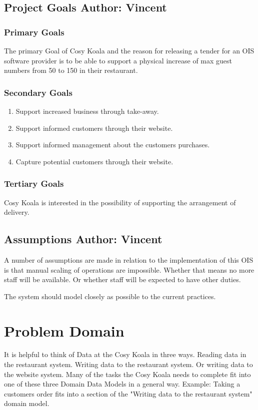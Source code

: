 \documentclass{article}
\begin{document}
\subsection{Project Goals \normalsize\textbf{Author: Vincent}}
\subsubsection{Primary Goals}
The primary Goal of Cosy Koala and the reason for releasing a tender for an OIS software provider is to be able to support a physical increase of max guest numbers from 50 to 150 in their restaurant.
\subsubsection{Secondary Goals}
\begin{enumerate}
    \item Support increased business through take-away.
    \item Support informed customers through their website.
    \item Support informed management about the customers purchases.
    \item Capture potential customers through their website.
\end{enumerate}
\subsubsection{Tertiary Goals}
Cosy Koala is interested in the possibility of supporting the arrangement of delivery.

\subsection{Assumptions \normalsize\textbf{Author: Vincent}}
A number of assumptions are made in relation to the implementation of this OIS is that manual scaling of operations are impossible. Whether that means no more staff will be available. Or whether staff will be expected to have other duties.

The system should model closely as possible to the current practices.


\clearpage

\section{Problem Domain}
It is helpful to think of Data at the Cosy Koala in three ways. Reading data in the restaurant system. Writing data to the restaurant system. Or writing data to the website system. 
Many of the tasks the Cosy Koala needs to complete fit into one of these three Domain Data Models in a general way. 
Example: Taking a customers order fits into a section of the "Writing data to the restaurant system" domain model.
\end{document}
